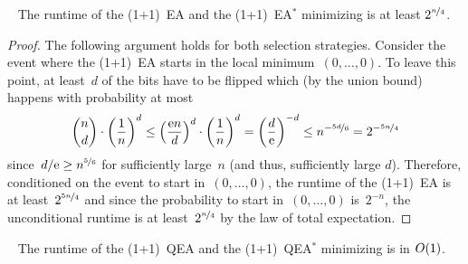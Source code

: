\documentclass[a4paper,11pt]{article}
\begin{document}
\begin{theorem}\label{thm:tinytrapclassical}~
The runtime of the (1+1)~EA and the (1+1)~EA$^*$ minimizing \tinytrap is at least $2^{\nicefrac{n}{4}}$.
\end{theorem}

\begin{proof}
The following argument holds for both selection strategies. Consider the event where the (1+1)~EA starts in the local minimum~$(0,\dots,0)$. To leave this point, at least~$d$ of the bits have to be flipped which (by the union bound) happens with probability at most
\[
\binom{n}{d}\cdot\left(\frac{1}{n}\right)^d\le\left(\frac{\mathrm{e} n}{d}\right)^d\cdot\left(\frac{1}{n}\right)^d = \left(\frac{d}{\mathrm{e}}\right)^{-d}\le n^{-\nicefrac{5d}{6}}=2^{-\nicefrac{5n}{4}}
\]
since~$d/\mathrm{e}\ge n^{\nicefrac{5}{6}}$ for sufficiently large~$n$ (and thus, sufficiently large $d$). Therefore, conditioned on the event to start in~$(0,\dots,0)$, the runtime of the (1+1)~EA is at least~$2^{\nicefrac{5n}{4}}$ and since the probability to start in~$(0,\dots,0)$ is~$2^{-n}$, the unconditional runtime is at least~$2^{\nicefrac{n}{4}}$ by the law of total expectation.
\end{proof}


\begin{theorem}\label{thm:tinytrapquantum}~
The runtime of the (1+1)~QEA and the (1+1)~QEA$^*$ minimizing \tinytrap is in ${O}(1)$.
\end{theorem}
\end{document}
